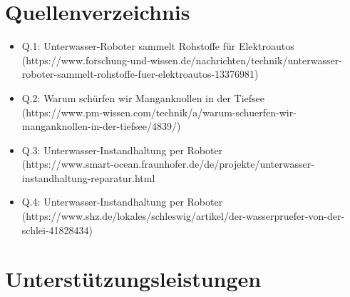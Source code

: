 \documentclass[11pt]{article}
\begin{document}

\newpage
\section{Quellenverzeichnis}
\begin{itemize}
    \item Q.1: Unterwasser-Roboter sammelt Rohstoffe für Elektroautos \\ (https://www.forschung-und-wissen.de/nachrichten/technik/unterwasser-roboter-sammelt-rohstoffe-fuer-elektroautos-13376981)
    \item Q.2: Warum schürfen wir Manganknollen in der Tiefsee \\ (https://www.pm-wissen.com/technik/a/warum-schuerfen-wir-manganknollen-in-der-tiefsee/4839/)
    \item Q.3: Unterwasser-Instandhaltung per Roboter \\ (https://www.smart-ocean.fraunhofer.de/de/projekte/unterwasser-instandhaltung-reparatur.html
    \item Q.4: Unterwasser-Instandhaltung per Roboter \\ (https://www.shz.de/lokales/schleswig/artikel/der-wasserpruefer-von-der-schlei-41828434)
\end{itemize}
\section{Unterstützungsleistungen}
\Unterstuetzungsleistungen
\end{document}
